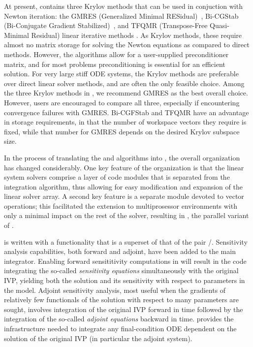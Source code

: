 At present, {\cvodes} contains three Krylov methods that can be used
in conjuction with Newton iteration:
the GMRES (Generalized Minimal RESidual)~\cite{SaSc:86},
Bi-CGStab (Bi-Conjugate Gradient Stabilized)~\cite{Van:92}, and
TFQMR (Transpose-Free Quasi-Minimal Residual) linear iterative methods
\cite{Fre:93}.  As Krylov methods, these require almost no matrix storage
for solving the Newton equations as compared to direct methods.
However, the algorithms allow for a user-supplied preconditioner
matrix, and for most problems preconditioning is essential for an
efficient solution.
For very large stiff ODE systems, the Krylov methods are preferable over
direct linear solver methods, and are often the only feasible choice.
Among the three Krylov methods in {\cvodes}, we recommend GMRES as the
best overall choice.  However, users are encouraged to compare all
three, especially if encountering convergence failures with GMRES.
Bi-CGFStab and TFQMR have an advantage in storage requirements, in
that the number of workspace vectors they require is fixed, while that
number for GMRES depends on the desired Krylov subspace size.

In the process of translating the {\vode} and {\vodpk} algorithms into
{\C}, the overall {\cvode} organization has changed considerably.  One
key feature of the {\cvode} organization is that the linear system
solvers comprise a layer of code modules that is separated from the
integration algorithm, thus allowing for easy modification and
expansion of the linear solver array.  A second key feature is a
separate module devoted to vector operations; this facilitated the
extension to multiprosessor environments with only a minimal impact on
the rest of the solver, resulting in {\pvode}
\cite{ByHi:99}, the parallel variant of {\cvode}.

{\cvodes} is written with a functionality that is a superset of that
of the pair {\cvode}/{\pvode}. Sensitivity analysis capabilities, both
forward and adjoint, have been added to the main integrator. Enabling
forward sensititivity computations in {\cvodes} will result in the
code integrating the so-called {\em sensitivity equations}
simultaneously with the original IVP, yielding both the solution and
its sensitivity with respect to parameters in the model. Adjoint
sensitivity analysis, most useful when the gradients of relatively few
functionals of the solution with respect to many parameters are
sought, involves integration of the original IVP forward in time
followed by the integration of the so-called {\em adjoint equations}
backward in time. {\cvodes} provides the infrastructure needed to
integrate any final-condition ODE dependent on the solution of the
original IVP (in particular the adjoint system).

